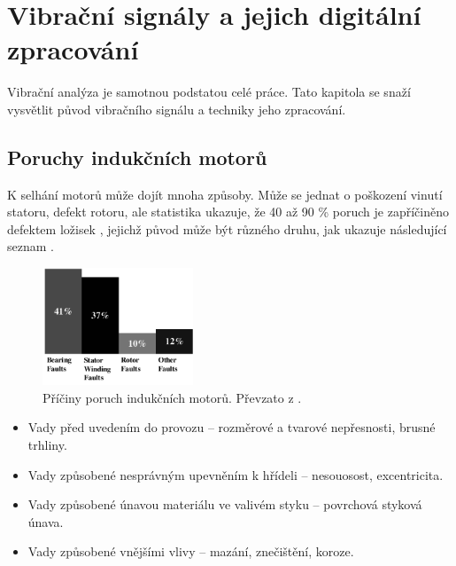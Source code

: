 \chapter{Vibrační signály a jejich digitální zpracování}

    Vibrační analýza je samotnou podstatou celé práce. Tato kapitola se snaží vysvětlit původ vibračního signálu a techniky jeho zpracování.

\section{Poruchy indukčních motorů}
\label{section:poruchy_mororu}
    K selhání motorů může dojít mnoha způsoby. Může se jednat o poškození vinutí statoru, defekt rotoru, ale statistika ukazuje, že 40 až 90 \% poruch je zapříčiněno defektem ložisek \cite{book:1}, jejichž původ může být různého druhu, jak ukazuje následující seznam \cite{prez:1}.
    \begin{figure} [!h]
        \centering
        \caption{Příčiny poruch indukčních motorů. Převzato z \cite{prez:2}.}
        \includegraphics[width=0.4\textwidth]{DSP/Figs/failures.png}
    \end{figure} 
   
    \begin{itemize}
        \item Vady před uvedením do provozu – rozměrové a tvarové nepřesnosti, brusné trhliny.
        \item Vady způsobené nesprávným upevněním k hřídeli – nesouosost, excentricita.
        \item Vady způsobené únavou materiálu ve valivém styku – povrchová styková únava.
        \item Vady způsobené vnějšími vlivy – mazání, znečištění, koroze.
    \end{itemize}
    
